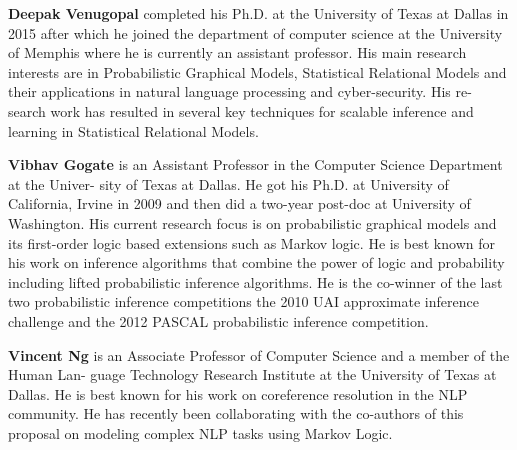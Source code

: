 \begin{bio}
	\textbf{Deepak Venugopal} completed his Ph.D. at the University of Texas at Dallas in 2015 after which he joined the department of computer science at the University of Memphis where he is currently an assistant professor. His main research interests are in Probabilistic Graphical Models, Statistical Relational Models and their applications in natural language processing and cyber-security. His re- search work has resulted in several key techniques for scalable inference and learning in Statistical Relational Models.

\textbf{Vibhav Gogate} is an Assistant Professor in the Computer Science Department at the Univer- sity of Texas at Dallas. He got his Ph.D. at University of California, Irvine in 2009 and then did a two-year post-doc at University of Washington. His current research focus is on probabilistic graphical models and its first-order logic based extensions such as Markov logic. He is best known for his work on inference algorithms that combine the power of logic and probability including lifted probabilistic inference algorithms. He is the co-winner of the last two probabilistic inference competitions the 2010 UAI approximate inference challenge and the 2012 PASCAL probabilistic inference competition.

\textbf{Vincent Ng} is an Associate Professor of Computer Science and a member of the Human Lan- guage Technology Research Institute at the University of Texas at Dallas. He is best known for his work on coreference resolution in the NLP community. He has recently been collaborating with the co-authors of this proposal on modeling complex NLP tasks using Markov Logic. 
  

\end{bio} 

